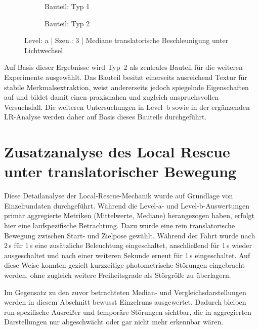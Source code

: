 \begin{figure}[htbp]
    \centering
    \begin{subfigure}[b]{0.49\textwidth}
        \caption{Bauteil: Typ 1}
        \label{fig:a_3_Typ1_timeseries_median_ibvs_lin_acc_l2}
    \end{subfigure}
    \hfill
    \begin{subfigure}[b]{0.49\textwidth}
        \caption{Bauteil: Typ 2}
        \label{fig:a_3_Typ2_timeseries_median_ibvs_lin_acc_l2}
    \end{subfigure}
    \caption{Level: a | Szen.: 3 | Mediane translatorische Beschleunigung unter Lichtwechsel}
    \label{fig:a_3_bauteilauswahl_lin_acc}
\end{figure}

Auf Basis dieser Ergebnisse wird Typ~2 als zentrales Bauteil für die weiteren Experimente ausgewählt. Das Bauteil besitzt einerseits ausreichend Textur für stabile Merkmalsextraktion, weist andererseits jedoch spiegelnde Eigenschaften auf und bildet damit einen praxisnahen und zugleich anspruchsvollen Versuchsfall. Die weiteren Untersuchungen in Level~b sowie in der ergänzenden \ac{LR}-Analyse werden daher auf Basis dieses Bauteils durchgeführt.

\section{Zusatzanalyse des Local Rescue unter translatorischer Bewegung}
\label{sec:lr_zusatzanalyse}

Diese Detailanalyse der Local-Rescue-Mechanik wurde auf Grundlage von Einzelrundaten durchgeführt. Während die Level-a- und Level-b-Auswertungen primär aggregierte Metriken (Mittelwerte, Mediane) herangezogen haben, erfolgt hier eine laufspezifische Betrachtung. Dazu wurde eine rein translatorische Bewegung zwischen Start- und Zielpose gewählt. Während der Fahrt wurde nach 2\,s für 1\,s eine zusätzliche Beleuchtung eingeschaltet, anschließend für 1\,s wieder ausgeschaltet und nach einer weiteren Sekunde erneut für 1\,s eingeschaltet. Auf diese Weise konnten gezielt kurzzeitige photometrische Störungen eingebracht werden, ohne zugleich weitere Freiheitsgrade als Störgröße zu überlagern.

Im Gegensatz zu den zuvor betrachteten Median- und Vergleichsdarstellungen werden in diesem Abschnitt bewusst Einzelruns ausgewertet. Dadurch bleiben run-spezifische Ausreißer und temporäre Störungen sichtbar, die in aggregierten Darstellungen nur abgeschwächt oder gar nicht mehr erkennbar wären.

